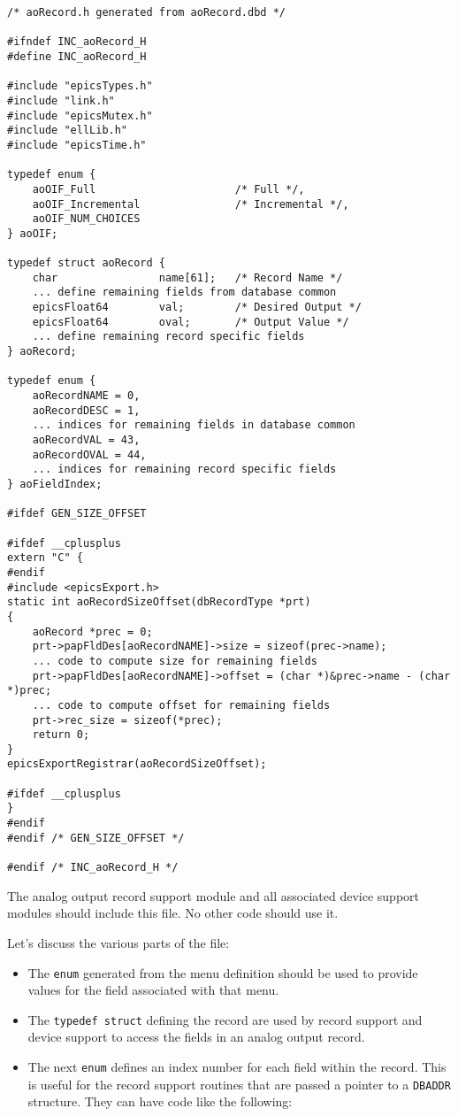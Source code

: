 \begin{verbatim}
/* aoRecord.h generated from aoRecord.dbd */

#ifndef INC_aoRecord_H
#define INC_aoRecord_H

#include "epicsTypes.h"
#include "link.h"
#include "epicsMutex.h"
#include "ellLib.h"
#include "epicsTime.h"

typedef enum {
    aoOIF_Full                      /* Full */,
    aoOIF_Incremental               /* Incremental */,
    aoOIF_NUM_CHOICES
} aoOIF;

typedef struct aoRecord {
    char                name[61];   /* Record Name */
    ... define remaining fields from database common
    epicsFloat64        val;        /* Desired Output */
    epicsFloat64        oval;       /* Output Value */
    ... define remaining record specific fields
} aoRecord;

typedef enum {
    aoRecordNAME = 0,
    aoRecordDESC = 1,
    ... indices for remaining fields in database common
    aoRecordVAL = 43,
    aoRecordOVAL = 44,
    ... indices for remaining record specific fields
} aoFieldIndex;

#ifdef GEN_SIZE_OFFSET

#ifdef __cplusplus
extern "C" {
#endif
#include <epicsExport.h>
static int aoRecordSizeOffset(dbRecordType *prt)
{
    aoRecord *prec = 0;
    prt->papFldDes[aoRecordNAME]->size = sizeof(prec->name);
    ... code to compute size for remaining fields
    prt->papFldDes[aoRecordNAME]->offset = (char *)&prec->name - (char *)prec;
    ... code to compute offset for remaining fields
    prt->rec_size = sizeof(*prec);
    return 0;
}
epicsExportRegistrar(aoRecordSizeOffset);

#ifdef __cplusplus
}
#endif
#endif /* GEN_SIZE_OFFSET */

#endif /* INC_aoRecord_H */
\end{verbatim}

The analog output record support module and all associated device support modules should include this file.
No other code should use it.

Let's discuss the various parts of the file:

\begin{itemize}
\item The \verb|enum| generated from the menu definition should be used to provide values for the field associated with that menu.

\item The \verb|typedef struct| defining the record are used by record support and device support to access the fields in an analog output record.

\item The next \verb|enum| defines an index number for each field within the record.
This is useful for the record support routines that are passed a pointer to a \verb|DBADDR| structure.
They can have code like the following:

\end{itemize}

